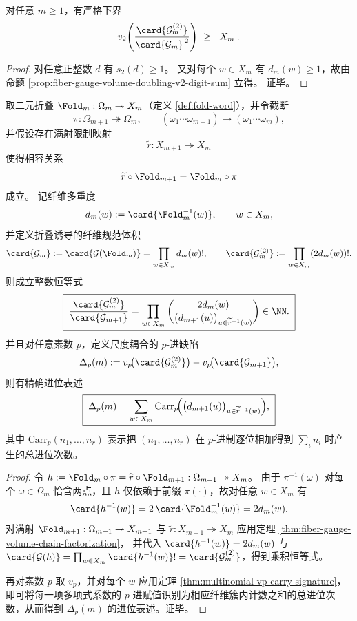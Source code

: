\begin{corollary}[二进进位增益的规模下界]\label{cor:fiber-gauge-volume-doubling-v2-lowerbound}
对任意 \(m\ge 1\)，有严格下界
\[
v_2\!\left(\frac{\card{\mathcal{G}_m^{(2)}}}{\card{\mathcal{G}_m}^{\,2}}\right)\ \ge\ |X_m|.
\]
\end{corollary}
\begin{proof}
对任意正整数 \(d\) 有 \(s_2(d)\ge 1\)。
又对每个 \(w\in X_m\) 有 \(d_m(w)\ge 1\)，故由命题 \ref{prop:fiber-gauge-volume-doubling-v2-digit-sum} 立得。
证毕。
\end{proof}

\begin{theorem}\label{thm:fold-multiscale-carry-defect}
取二元折叠 \(\Fold_m:\Omega_m\twoheadrightarrow X_m\)（定义 \ref{def:fold-word}），并令截断
\[
\pi:\Omega_{m+1}\twoheadrightarrow\Omega_m,\qquad
(\omega_1\cdots \omega_{m+1})\mapsto(\omega_1\cdots\omega_m),
\]
并假设存在满射限制映射
\[
\widetilde r:X_{m+1}\twoheadrightarrow X_m
\]
使得相容关系
\[
\widetilde r\circ\Fold_{m+1}=\Fold_m\circ\pi
\]
成立。
记纤维多重度
\[
d_m(w):=\card{\Fold_m^{-1}(w)},\qquad w\in X_m,
\]
并定义折叠诱导的纤维规范体积
\[
\card{\mathcal{G}_m}:=\card{\mathcal{G}(\Fold_m)}=\prod_{w\in X_m} d_m(w)!,
\qquad
\card{\mathcal{G}_m^{(2)}}:=\prod_{w\in X_m}(2d_m(w))!.
\]
则成立整数恒等式
\[
\boxed{\;
\frac{\card{\mathcal{G}_m^{(2)}}}{\card{\mathcal{G}_{m+1}}}
=
\prod_{w\in X_m}
\binom{2d_m(w)}{\bigl(d_{m+1}(u)\bigr)_{u\in\widetilde r^{-1}(w)}}
\in\NN.
\;}
\]
并且对任意素数 \(p\)，定义尺度耦合的 \(p\)-进缺陷
\[
\Delta_p(m):=v_p\!\bigl(\card{\mathcal{G}_m^{(2)}}\bigr)-v_p\!\bigl(\card{\mathcal{G}_{m+1}}\bigr),
\]
则有精确进位表述
\[
\boxed{\;
\Delta_p(m)
=
\sum_{w\in X_m}
\mathrm{Carr}_p\!\Bigl(\bigl(d_{m+1}(u)\bigr)_{u\in\widetilde r^{-1}(w)}\Bigr),
\;}
\]
其中 \(\mathrm{Carr}_p(n_1,\dots,n_r)\) 表示把 \((n_1,\dots,n_r)\) 在 \(p\)-进制逐位相加得到 \(\sum_i n_i\) 时产生的总进位次数。
\end{theorem}

\begin{proof}
令 \(h:=\Fold_m\circ\pi=\widetilde r\circ\Fold_{m+1}:\Omega_{m+1}\twoheadrightarrow X_m\)。
由于 \(\pi^{-1}(\omega)\) 对每个 \(\omega\in\Omega_m\) 恰含两点，且 \(h\) 仅依赖于前缀 \(\pi(\cdot)\)，故对任意 \(w\in X_m\) 有
\[
\card{h^{-1}(w)}=2\,\card{\Fold_m^{-1}(w)}=2d_m(w).
\]
对满射 \(\Fold_{m+1}:\Omega_{m+1}\twoheadrightarrow X_{m+1}\) 与 \(\widetilde r:X_{m+1}\twoheadrightarrow X_m\) 应用定理 \ref{thm:fiber-gauge-volume-chain-factorization}，
并代入 \(\card{h^{-1}(w)}=2d_m(w)\) 与
\(
\card{\mathcal{G}(h)}=\prod_{w\in X_m}\card{h^{-1}(w)}!=\card{\mathcal{G}_m^{(2)}}
\)，得到乘积恒等式。

再对素数 \(p\) 取 \(v_p\)，并对每个 \(w\) 应用定理 \ref{thm:multinomial-vp-carry-signature}，
即可将每一项多项式系数的 \(p\)-进赋值识别为相应纤维簇内计数之和的总进位次数，从而得到 \(\Delta_p(m)\) 的进位表述。证毕。
\end{proof}

